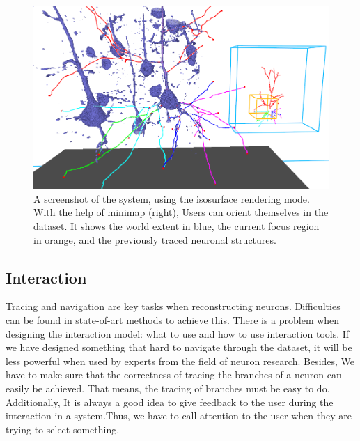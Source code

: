 \documentclass[10pt,twocolumn,letterpaper]{article}
\begin{document}
\begin{figure}[h]
\begin{center}
   \includegraphics[width=1.0\linewidth]{neuron-render.png}
\end{center}
   \caption{A screenshot of the system, using the isosurface rendering mode. With the help of minimap (right), Users can orient themselves in the dataset. It shows the world extent in blue, the current
focus region in orange, and the previously traced neuronal structures.}
\label{fig:long}
\label{fig:onecol}
\end{figure}

\subsection{Interaction}
Tracing and navigation are key tasks when reconstructing neurons. Difficulties can be found in state-of-art methods to achieve this. There is a problem when designing the interaction model: what to use and how to use interaction tools. If we have designed something that hard to navigate through the dataset, it will be less powerful when used by experts from the field of neuron research. Besides, We have to make sure that the correctness of tracing the branches of a neuron can easily be achieved. That means, the tracing of branches must be easy to do. Additionally, It is always a good idea to give feedback to the user during the interaction in a system.Thus, we have to call attention to the user when they are trying to select something.
\end{document}
